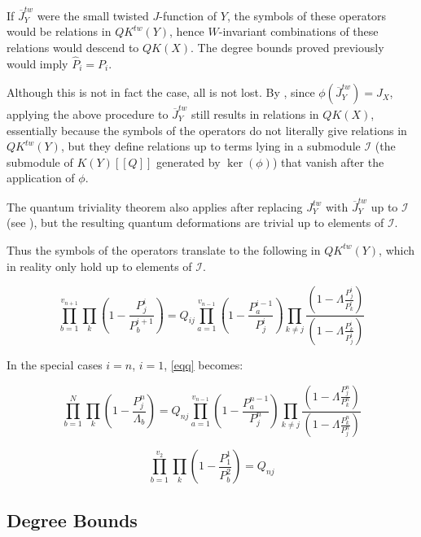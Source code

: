 \documentclass[11pt,letterpaper]{amsart}
\begin{document}
If $\overline{J}^{tw}_Y$ were the small twisted $J$-function of $Y$, the symbols of these operators would be relations in $QK^{tw}(Y)$, hence $W$-invariant combinations of these relations would descend to $QK(X)$. The degree bounds proved previously would imply $\hat{P}_i=P_i$. 

Although this is not in fact the case, all is not lost. By \cite[Thm 6.15]{me}, since $\phi(\overline{J}^{tw}_Y)=J_X$, applying the above procedure to $\overline{J}^{tw}_Y$ still results in relations in $QK(X)$, essentially because the symbols of the operators do not literally give relations in $QK^{tw}(Y)$, but they define relations up to terms lying in a submodule $\mathscr{I}$ (the submodule of $K(Y)[[Q]]$ generated by $\ker(\phi)$) that vanish after the application of $\phi$. 

The quantum triviality theorem also applies after replacing $J^{tw}_Y$ with $\overline{J}^{tw}_Y$ up to $\mathscr{I}$ (see \cite[Cor 4.14]{me}), but the resulting quantum deformations are trivial up to elements of $\mathscr{I}$. 


Thus the symbols of the operators translate to the following  in $QK^{tw}(Y)$, which in reality only hold up to elements of $\mathscr{I}$.

\begin{equation}
\label{eqq}
\prod_{b=1}^{v_{n+1}}\prod_k(1-\frac{P^i_j}{P^{i+1}_b})=Q_{ij}\prod_{a=1}^{v_{n-1}}(1-\frac{P^{i-1}_a}{P^{i}_j})\prod_{k\neq j}\frac{(1-\Lambda \frac{P_j^i}{P_k^{i}})}{ (1-\Lambda \frac{P^i_k}{P^i_j})}
\end{equation}

In the special cases $i=n$, $i=1$, \eqref{eqq} becomes:

\begin{equation}
\prod_{b=1}^{N}\prod_k(1-\frac{P^n_j}{\Lambda_b})=Q_{nj}\prod_{a=1}^{v_{n-1}}(1-\frac{P^{n-1}_a}{P^{n}_j})\prod_{k\neq j}\frac{(1-\Lambda \frac{P_j^n}{P_k^{n}})}{ (1-\Lambda \frac{P^n_k}{P^n_j})}
\end{equation}

\begin{equation}
\prod_{b=1}^{v_2}\prod_k(1-\frac{P^1_1}{P^2_b})=Q_{nj}
\end{equation}






\subsection{Degree Bounds}
\end{document}
